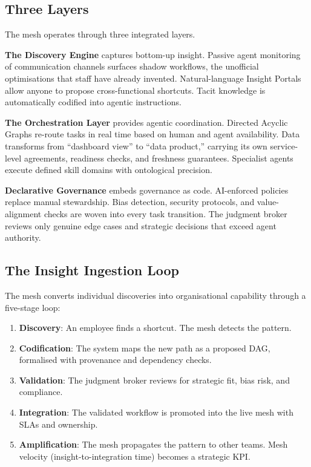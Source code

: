 \subsection{Three Layers}

The mesh operates through three integrated layers.

\textbf{The Discovery Engine} captures bottom-up insight. Passive agent monitoring of communication channels surfaces shadow workflows, the unofficial optimisations that staff have already invented. Natural-language Insight Portals allow anyone to propose cross-functional shortcuts. Tacit knowledge is automatically codified into agentic instructions.

\textbf{The Orchestration Layer} provides agentic coordination. Directed Acyclic Graphs re-route tasks in real time based on human and agent availability. Data transforms from ``dashboard view'' to ``data product,'' carrying its own service-level agreements, readiness checks, and freshness guarantees. Specialist agents execute defined skill domains with ontological precision.

\textbf{Declarative Governance} embeds governance as code. AI-enforced policies replace manual stewardship. Bias detection, security protocols, and value-alignment checks are woven into every task transition. The judgment broker reviews only genuine edge cases and strategic decisions that exceed agent authority.

\subsection{The Insight Ingestion Loop}

The mesh converts individual discoveries into organisational capability through a five-stage loop:

\begin{enumerate}
  \item \textbf{Discovery}: An employee finds a shortcut. The mesh detects the pattern.
  \item \textbf{Codification}: The system maps the new path as a proposed DAG, formalised with provenance and dependency checks.
  \item \textbf{Validation}: The judgment broker reviews for strategic fit, bias risk, and compliance.
  \item \textbf{Integration}: The validated workflow is promoted into the live mesh with SLAs and ownership.
  \item \textbf{Amplification}: The mesh propagates the pattern to other teams. Mesh velocity (insight-to-integration time) becomes a strategic KPI.
\end{enumerate}

